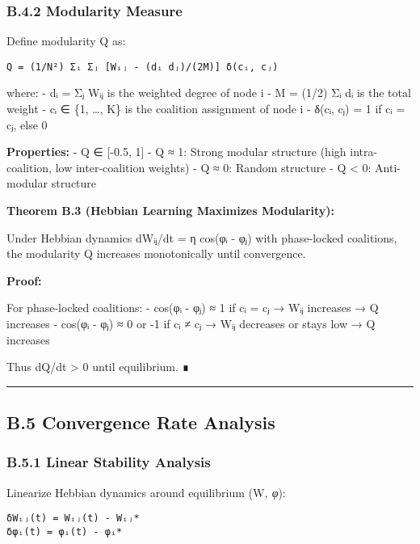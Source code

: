 \documentclass[
]{article}
\begin{document}
\subsubsection{B.4.2 Modularity Measure}\label{b.4.2-modularity-measure}

Define modularity Q as:

\begin{verbatim}
Q = (1/N²) Σᵢ Σⱼ [Wᵢⱼ - (dᵢ dⱼ)/(2M)] δ(cᵢ, cⱼ)
\end{verbatim}

where: - dᵢ = Σⱼ Wᵢⱼ is the weighted degree of node i - M = (1/2) Σᵢ dᵢ
is the total weight - cᵢ ∈ \{1, \ldots, K\} is the coalition assignment
of node i - δ(cᵢ, cⱼ) = 1 if cᵢ = cⱼ, else 0

\textbf{Properties:} - Q ∈ {[}-0.5, 1{]} - Q ≈ 1: Strong modular
structure (high intra-coalition, low inter-coalition weights) - Q ≈ 0:
Random structure - Q \textless{} 0: Anti-modular structure

\textbf{Theorem B.3 (Hebbian Learning Maximizes Modularity):}

Under Hebbian dynamics dWᵢⱼ/dt = η cos(φᵢ - φⱼ) with phase-locked
coalitions, the modularity Q increases monotonically until convergence.

\textbf{Proof:}

For phase-locked coalitions: - cos(φᵢ - φⱼ) ≈ 1 if cᵢ = cⱼ → Wᵢⱼ
increases → Q increases - cos(φᵢ - φⱼ) ≈ 0 or -1 if cᵢ ≠ cⱼ → Wᵢⱼ
decreases or stays low → Q increases

Thus dQ/dt \textgreater{} 0 until equilibrium. ∎

\begin{center}\rule{0.5\linewidth}{0.5pt}\end{center}

\subsection{B.5 Convergence Rate
Analysis}\label{b.5-convergence-rate-analysis}

\subsubsection{B.5.1 Linear Stability
Analysis}\label{b.5.1-linear-stability-analysis}

Linearize Hebbian dynamics around equilibrium (W\emph{, φ}):

\begin{verbatim}
δWᵢⱼ(t) = Wᵢⱼ(t) - Wᵢⱼ*
δφᵢ(t) = φᵢ(t) - φᵢ*
\end{verbatim}
\end{document}
